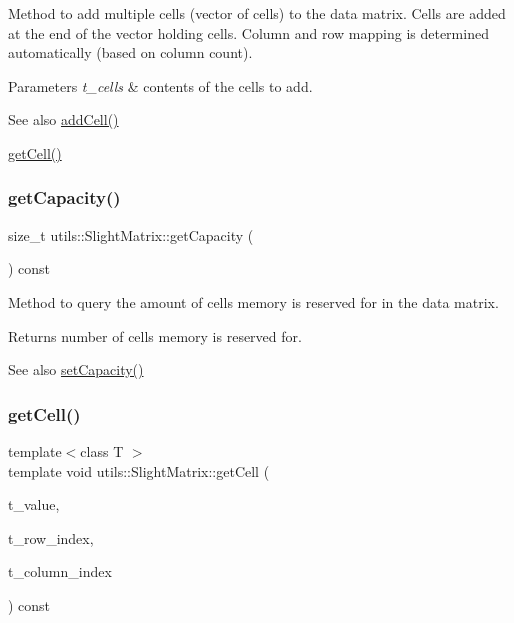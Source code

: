 Method to add multiple cells (vector of cells) to the data matrix. Cells are added at the end of the vector holding cells. Column and row mapping is determined automatically (based on column count). 
\begin{DoxyParams}{Parameters}
{\em t\+\_\+cells} & contents of the cells to add. \\
\hline
\end{DoxyParams}
\begin{DoxySeeAlso}{See also}
\hyperlink{classutils_1_1SlightMatrix_ac2d5111e5a9865886f5370bf1487d04c}{add\+Cell()} 

\hyperlink{classutils_1_1SlightMatrix_a38fb4bf075982a520ebc400296c737b8}{get\+Cell()} 
\end{DoxySeeAlso}
\mbox{\label{classutils_1_1SlightMatrix_addbfd1ec641100a7cda0b4f6e39ae676}} 
\subsubsection{\texorpdfstring{get\+Capacity()}{getCapacity()}}
{\footnotesize\ttfamily size\+\_\+t utils\+::\+Slight\+Matrix\+::get\+Capacity (\begin{DoxyParamCaption}\item[{void}]{ }\end{DoxyParamCaption}) const}

Method to query the amount of cells memory is reserved for in the data matrix. \begin{DoxyReturn}{Returns}
number of cells memory is reserved for. 
\end{DoxyReturn}
\begin{DoxySeeAlso}{See also}
\hyperlink{classutils_1_1SlightMatrix_ac0c6859041a90cfdf39d6c4f5a668814}{set\+Capacity()} 
\end{DoxySeeAlso}
\mbox{\label{classutils_1_1SlightMatrix_a38fb4bf075982a520ebc400296c737b8}} 
\subsubsection{\texorpdfstring{get\+Cell()}{getCell()}}
{\footnotesize\ttfamily template$<$class T $>$ \\
template void utils\+::\+Slight\+Matrix\+::get\+Cell (\begin{DoxyParamCaption}\item[{T \&}]{t\+\_\+value,  }\item[{const size\+\_\+t}]{t\+\_\+row\+\_\+index,  }\item[{const size\+\_\+t}]{t\+\_\+column\+\_\+index }\end{DoxyParamCaption}) const}

